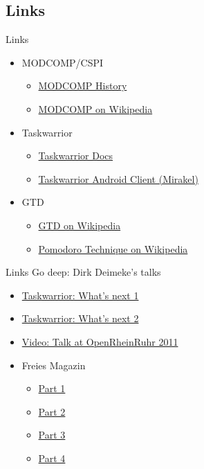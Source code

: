 \documentclass[xcolor=x11names,compress]{beamer}
\renewcommand{\(}{\begin{columns}}
\renewcommand{\)}{\end{columns}}
\newcommand{\<}[1]{\begin{column}{#1}}
\renewcommand{\>}{\end{column}}
\begin{document}
\subsection{Links}

\begin{frame}[fragile]{Links}
	\begin{itemize}
		\item MODCOMP/CSPI
		\begin{itemize}
			\item \href{http://www.cspi.com/de/uber/history}{MODCOMP History}
			\item \href{https://en.wikipedia.org/wiki/MODCOMP}{MODCOMP on Wikipedia}
		\end{itemize}
		\item Taskwarrior
		\begin{itemize}
			\item \href{http://taskwarrior.org/docs/}{Taskwarrior Docs}
			\item \href{http://mirakel.azapps.de/}{Taskwarrior Android Client (Mirakel)}
		\end{itemize}
		\item GTD
		\begin{itemize}
			\item \href{https://en.wikipedia.org/wiki/Getting_Things_Done}{GTD on Wikipedia}
			\item \href{https://en.wikipedia.org/wiki/Pomodoro_Technique}{Pomodoro Technique on Wikipedia}
		\end{itemize}
	\end{itemize}
\end{frame}

\begin{frame}[fragile]{Links}
	Go deep: Dirk Deimeke's talks \vspace{3pt}
	\begin{itemize}
		\item \href{https://speakerdeck.com/ddeimeke/taskwarrior-whats-next-1}{Taskwarrior: What's next 1}
		\item \href{https://speakerdeck.com/ddeimeke/taskwarrior-whats-next-2}{Taskwarrior: What's next 2}
		\item \href{http://www.deimeke.net/dirk/blog/index.php?/archives/2855-Taskwarrior-Vortrag-....html}{Video: Talk at OpenRheinRuhr 2011}
		\item Freies Magazin
		\begin{itemize}
			\item \href{http://www.freiesmagazin.de/20120805-augustausgabe-erschienen}{Part 1}
			\item \href{http://www.freiesmagazin.de/20120902-septemberausgabe-erschienen}{Part 2}
			\item \href{http://www.freiesmagazin.de/20121007-oktoberausgabe-erschienen}{Part 3}
			\item \href{http://www.freiesmagazin.de/20121104-novemberausgabe-erschienen}{Part 4}
		\end{itemize}
	\end{itemize}
\end{frame}
\end{document}
